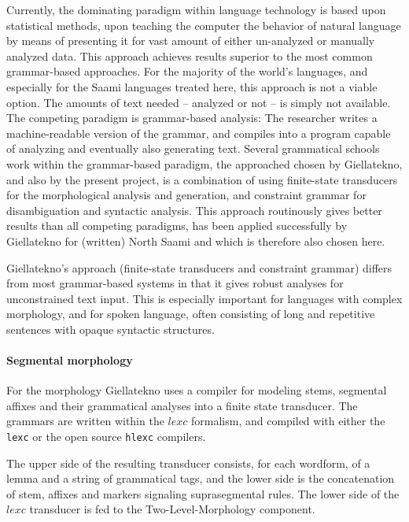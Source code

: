 \documentclass[a4paper,12pt]{article}
\begin{document}
Currently, the dominating paradigm within language technology is based upon statistical methods, upon teaching the computer the behavior of natural language by means of presenting it for vast amount of either un-analyzed or manually analyzed data. This approach achieves results superior to the most common grammar-based approaches. For the majority of the world's languages, and especially for the Saami languages treated here, this approach is not a viable option. The amounts of text needed – analyzed or not – is simply not available. The competing paradigm is grammar-based analysis: The researcher writes a machine-readable version of the grammar, and compiles into a program capable of analyzing and eventually also generating text. Several grammatical schools work within the grammar-based paradigm, the approached chosen by Giellatekno, and also by the present project, is a combination of using finite-state transducers for the morphological analysis and generation, and constraint grammar for disambiguation and syntactic analysis. This approach routinously gives better results than all competing paradigms, has been applied successfully by Giellatekno for (written) North Saami and which is therefore also chosen here.

Giellatekno's approach (finite-state transducers and constraint grammar) differs from most grammar-based systems in that it gives robust analyses for unconstrained text input. This is especially important for languages with complex morphology, and for spoken language, often consisting of long and repetitive sentences with opaque syntactic structures.

\paragraph{Segmental morphology}
For the morphology Giellatekno uses a compiler for modeling stems, segmental affixes and their grammatical analyses into a finite state transducer. The grammars are written within the $lexc$ formalism, and compiled with either the \texttt{lexc} or the open source \texttt{hlexc} compilers. 

The upper side of the resulting transducer consists, for each wordform, of a lemma and a string of grammatical tags, and the lower side is the concatenation of stem, affixes and markers signaling suprasegmental rules. The lower side of the $lexc$ transducer is fed to the Two-Level-Morphology component.
\end{document}
